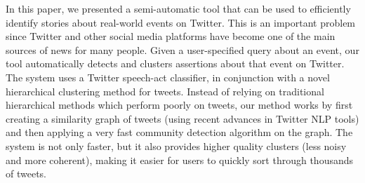 \documentclass[letterpaper]{article}
\begin{document}
In this paper, we presented a semi-automatic tool that can be used to efficiently identify stories about real-world events on Twitter. This is an important problem since Twitter and other social media platforms have become one of the main sources of news for many people. %
Given a user-specified query about an event, our tool automatically detects and clusters assertions about that event on Twitter. The system uses a Twitter speech-act classifier, in conjunction with a novel hierarchical clustering method for tweets. Instead of relying on traditional hierarchical methods which perform  poorly on tweets, our method works by first creating a similarity graph of tweets (using recent advances in Twitter NLP tools) and then applying a very fast community detection algorithm on the graph. The system is not only faster, but it also provides higher quality clusters (less noisy and more coherent), making it easier for users to quickly sort through thousands of tweets.

\end{document}
